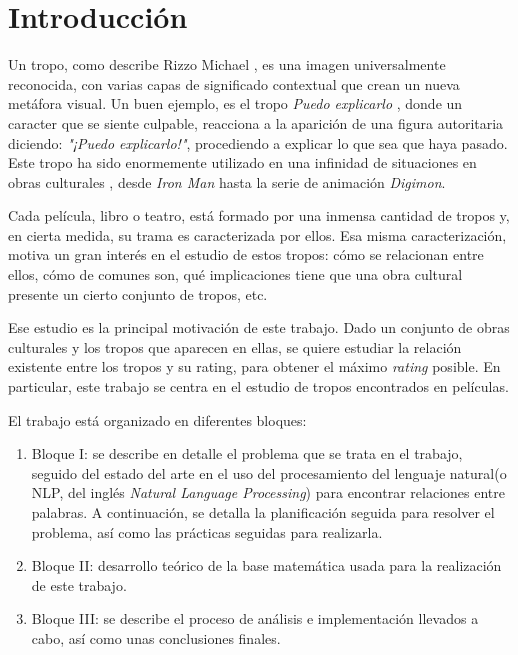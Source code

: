 \chapter{Introducción}

Un tropo, como describe Rizzo Michael \cite{rizzo2013art}, es una imagen
universalmente reconocida, con varias capas de significado contextual que
crean un nueva metáfora visual. Un buen ejemplo, es el tropo \emph{Puedo explicarlo} \cite{tropo:ICanExplain}, donde un caracter que se siente culpable,
reacciona a la aparición de una figura autoritaria diciendo: \emph{"¡Puedo
    explicarlo!"}, procediendo a explicar lo que sea que haya pasado. Este tropo ha
sido enormemente utilizado en una infinidad de situaciones en obras culturales
\cite{tropo:ICanExplain}, desde \emph{Iron Man} hasta la serie de animación
\emph{Digimon}.

Cada película, libro o teatro, está formado por una inmensa cantidad de tropos
y, en cierta medida, su trama es caracterizada por ellos. Esa misma
caracterización, motiva un gran interés en el estudio de estos tropos: cómo se
relacionan entre ellos, cómo de comunes son, qué implicaciones tiene que una
obra cultural presente un cierto conjunto de tropos, etc.

Ese estudio es la principal motivación de este trabajo. Dado un conjunto de
obras culturales y los tropos que aparecen en ellas, se quiere estudiar la
relación existente entre los tropos y su rating, para obtener el máximo \emph
{rating} posible. En particular, este trabajo se centra en el estudio de tropos
encontrados en películas.

El trabajo está organizado en diferentes bloques:

\begin{enumerate}
    \item Bloque I: se describe en detalle el problema que se trata en el
          trabajo, seguido del estado del arte en el uso del procesamiento del lenguaje natural(o NLP, del inglés \textit{Natural Language Processing}) para encontrar
          relaciones entre palabras. A continuación, se detalla la planificación
          seguida para resolver el problema, así como las prácticas seguidas para
          realizarla.
    \item Bloque II: desarrollo teórico de la base matemática usada para la
          realización de este trabajo.
    \item Bloque III: se describe el proceso de análisis e implementación
          llevados a cabo, así como unas conclusiones finales.
\end{enumerate}

